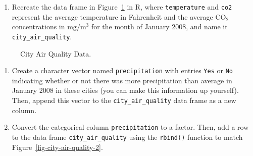 \documentclass[
  letterpaper,
]{latex/krantz}
\providecommand{\tightlist}{%
  \setlength{\itemsep}{0pt}\setlength{\parskip}{0pt}}\usepackage{longtable,booktabs,array}
\begin{document}
\begin{enumerate}
\def\labelenumi{\arabic{enumi}.}
\tightlist
\item
  Recreate the data frame in Figure~\ref{fig-city-air-quality} in R,
  where \texttt{temperature} and \texttt{co2} represent the average
  temperature in Fahrenheit and the average \(\text{CO}_2\)
  concentrations in \(\text{mg}/\text{m}^3\) for the month of January
  2008, and name it \texttt{city\_air\_quality}.
\end{enumerate}

\begin{figure}


\caption{\label{fig-city-air-quality}City Air Quality Data.}

\end{figure}%

\begin{enumerate}
\def\labelenumi{\arabic{enumi}.}
\setcounter{enumi}{1}
\item
  Create a character vector named \texttt{precipitation} with entries
  \texttt{Yes} or \texttt{No} indicating whether or not there was more
  precipitation than average in January 2008 in these cities (you can
  make this information up yourself). Then, append this vector to the
  \texttt{city\_air\_quality} data frame as a new column.
\item
  Convert the categorical column \texttt{precipitation} to a factor.
  Then, add a row to the data frame \texttt{city\_air\_quality} using
  the \texttt{rbind()} function to match
  Figure~\ref{fig-city-air-quality-2}.
\end{enumerate}
\end{document}
